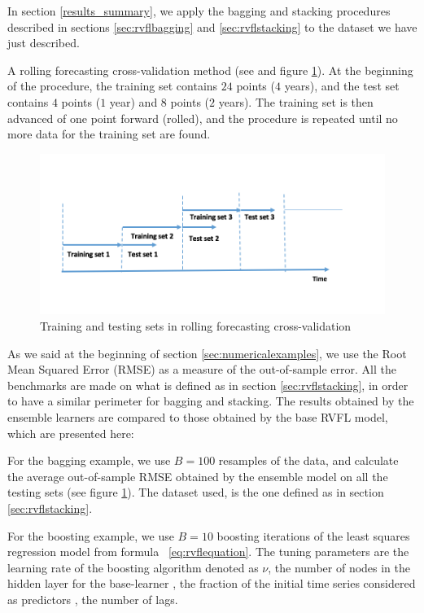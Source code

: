 
In section \ref{results_summary}, we apply the bagging and stacking procedures described in sections \ref{sec:rvflbagging} and \ref{sec:rvflstacking} to the dataset we have just described.


A rolling forecasting cross-validation method (see \cite{bergmeir2015note} and figure \ref{rolling_cv}). At the beginning of the procedure, the training set contains $24$ points ($4$ years), and the test set contains $4$ points ($1$ year) and $8$ points ($2$ years). The training set is then advanced of one point forward (rolled), and the procedure is repeated until no more data for the training set are found.

\begin{figure}[!htb]
\centering
\includegraphics[width=14cm]{gfx/chapter-rvfl-ensembles/rolling_cv.png}
\caption{Training and testing sets in rolling forecasting cross-validation}
\label{rolling_cv}
\end{figure}

As we said at the beginning of section \ref{sec:numericalexamples}, we use the Root Mean Squared Error (RMSE) as a measure of the out-of-sample error. All the benchmarks are made on what is defined as  in section \ref{sec:rvflstacking}, in order to have a similar perimeter for bagging and stacking. The results obtained by the ensemble learners are compared to those obtained by the base RVFL model, which are presented here:

For the bagging example, we use $B = 100$ resamples of the data, and calculate the average out-of-sample RMSE obtained by the ensemble model on all the testing sets (see figure \ref{rolling_cv}). The dataset used, is the one defined as  in section \ref{sec:rvflstacking}.

For the boosting example, we use $B = 10$ boosting iterations of the least squares regression model from formula ~\ref{eq:rvflequation}. The tuning parameters are the learning rate of the boosting algorithm denoted as $\nu$, the number of nodes in the hidden layer for the base-learner , the fraction of the initial time series considered as predictors , the number of lags.

